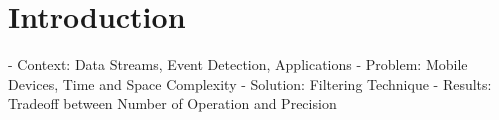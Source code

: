\newpage
\section{Introduction} \label{introduction}

- Context: Data Streams, Event Detection, Applications
- Problem: Mobile Devices, Time and Space Complexity
- Solution: Filtering Technique
- Results: Tradeoff between Number of Operation and Precision